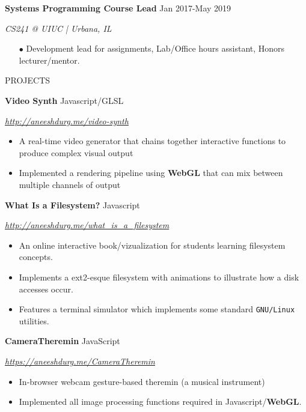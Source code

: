 \documentclass[paper=a4,fontsize=11pt]{scrartcl} %
\newcommand{\sepspace}{\vspace*{1em}}		%
\newcommand{\NewPart}[1]{ \noindent \large \usefont{OT1}{phv}{b}{n}\uppercase{#1} \normalfont \normalsize}
\newcommand{\EducationEntry}[4]{
		\noindent \textbf{#1}     %
			\hfill#2 \par  %
		\noindent \textit{#3} \par        %
		\noindent\hangafter=0 \small #4 %
		\normalsize \par}
\begin{document}
\begin{minipage}[t]{0.7\textwidth}
\EducationEntry{Systems Programming Course Lead}{Jan 2017-May 2019}{CS241 @ UIUC | Urbana, IL}{
\begin{itemize}
  \item[$\bullet$] Development lead for assignments, Lab/Office hours assistant, Honors lecturer/mentor.
\end{itemize}
}

\sepspace
\NewPart{Projects}{}

\EducationEntry{Video Synth}{Javascript/GLSL}{\url{http://aneeshdurg.me/video-synth}}{
\begin{itemize}
\item A real-time video generator that chains together interactive functions to produce complex visual output
\item Implemented a rendering pipeline using \textbf{WebGL} that can mix between multiple channels of output
\end{itemize}
}

\EducationEntry{What Is a Filesystem?}{Javascript}{\url{http://aneeshdurg.me/what_is_a_filesystem}}{
\begin{itemize}
\item An online interactive book/vizualization for students learning filesystem concepts.
\item Implements a ext2-esque filesystem with animations to illustrate how a disk accesses occur.
\item Features a terminal simulator which implements some standard \texttt{GNU/Linux} utilities.%
\end{itemize}
}
\EducationEntry{CameraTheremin}{JavaScript}{\url{https://aneeshdurg.me/CameraTheremin}}{
\begin{itemize}
\item In-browser webcam gesture-based theremin (a musical instrument)
\item Implemented all image processing functions required in Javascript/\textbf{WebGL}.
\end{itemize}
}
\end{minipage}
\end{document}
